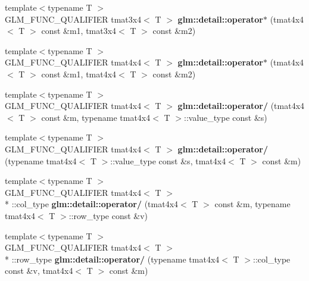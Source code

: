 \begin{DoxyCompactItemize}
\item 
\hypertarget{namespaceglm_1_1detail_ad6d969daf73291b215cd460150306857}{{\footnotesize template$<$typename T $>$ }\\G\-L\-M\-\_\-\-F\-U\-N\-C\-\_\-\-Q\-U\-A\-L\-I\-F\-I\-E\-R tmat3x4$<$ T $>$ {\bfseries glm\-::detail\-::operator$\ast$} (tmat4x4$<$ T $>$ const \&m1, tmat3x4$<$ T $>$ const \&m2)}\label{namespaceglm_1_1detail_ad6d969daf73291b215cd460150306857}

\item 
\hypertarget{namespaceglm_1_1detail_a35c87764ddeb928087a04465e14f732b}{{\footnotesize template$<$typename T $>$ }\\G\-L\-M\-\_\-\-F\-U\-N\-C\-\_\-\-Q\-U\-A\-L\-I\-F\-I\-E\-R tmat4x4$<$ T $>$ {\bfseries glm\-::detail\-::operator$\ast$} (tmat4x4$<$ T $>$ const \&m1, tmat4x4$<$ T $>$ const \&m2)}\label{namespaceglm_1_1detail_a35c87764ddeb928087a04465e14f732b}

\item 
\hypertarget{namespaceglm_1_1detail_a45028fc42b0b726fd694f154549e0fba}{{\footnotesize template$<$typename T $>$ }\\G\-L\-M\-\_\-\-F\-U\-N\-C\-\_\-\-Q\-U\-A\-L\-I\-F\-I\-E\-R tmat4x4$<$ T $>$ {\bfseries glm\-::detail\-::operator/} (tmat4x4$<$ T $>$ const \&m, typename tmat4x4$<$ T $>$\-::value\-\_\-type const \&s)}\label{namespaceglm_1_1detail_a45028fc42b0b726fd694f154549e0fba}

\item 
\hypertarget{namespaceglm_1_1detail_a36ef07e879cd9ff478300d31e1119228}{{\footnotesize template$<$typename T $>$ }\\G\-L\-M\-\_\-\-F\-U\-N\-C\-\_\-\-Q\-U\-A\-L\-I\-F\-I\-E\-R tmat4x4$<$ T $>$ {\bfseries glm\-::detail\-::operator/} (typename tmat4x4$<$ T $>$\-::value\-\_\-type const \&s, tmat4x4$<$ T $>$ const \&m)}\label{namespaceglm_1_1detail_a36ef07e879cd9ff478300d31e1119228}

\item 
\hypertarget{namespaceglm_1_1detail_ab61569f90e0a8261a3c42fb50803b220}{{\footnotesize template$<$typename T $>$ }\\G\-L\-M\-\_\-\-F\-U\-N\-C\-\_\-\-Q\-U\-A\-L\-I\-F\-I\-E\-R tmat4x4$<$ T $>$\\*
\-::col\-\_\-type {\bfseries glm\-::detail\-::operator/} (tmat4x4$<$ T $>$ const \&m, typename tmat4x4$<$ T $>$\-::row\-\_\-type const \&v)}\label{namespaceglm_1_1detail_ab61569f90e0a8261a3c42fb50803b220}

\item 
\hypertarget{namespaceglm_1_1detail_aec04bbab896710a238403f28ee25c7f7}{{\footnotesize template$<$typename T $>$ }\\G\-L\-M\-\_\-\-F\-U\-N\-C\-\_\-\-Q\-U\-A\-L\-I\-F\-I\-E\-R tmat4x4$<$ T $>$\\*
\-::row\-\_\-type {\bfseries glm\-::detail\-::operator/} (typename tmat4x4$<$ T $>$\-::col\-\_\-type const \&v, tmat4x4$<$ T $>$ const \&m)}\label{namespaceglm_1_1detail_aec04bbab896710a238403f28ee25c7f7}


\end{DoxyCompactItemize}
